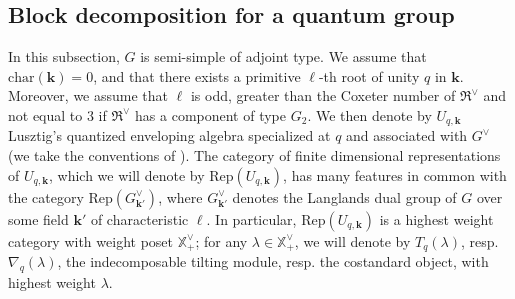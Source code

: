 \documentclass[11pt]{amsart}
\theoremstyle{plain}
\theoremstyle{remark}
\numberwithin{equation}{section}
\begin{document}
	
	\subsection{Block decomposition for a quantum group}\label{Block decomposition of a quantum group}
	In this subsection, $G$ is semi-simple of adjoint type. We assume that $\mathrm{char}(\mathbf{k})=0$, and that there exists a primitive $\ell$-th root of unity $q$ in $\mathbf{k}$. Moreover, we assume that $\ell$ is odd, greater than the Coxeter number of $\mathfrak{R}^\vee$ and not equal to $3$ if $\mathfrak{R}^\vee$ has a component of type $G_2$. We then denote by $U_{q,\mathbf{k}}$ Lusztig's quantized enveloping algebra specialized at $q$ and associated with $G^\vee$ (we take the conventions of \cite[§H]{jantzen2003representations}). The category of finite dimensional representations of $U_{q,\mathbf{k}}$, which we will denote by $\mathrm{Rep}(U_{q,\mathbf{k}})$, has many features in common with the category $\mathrm{Rep}(G^\vee_{\mathbf{k}'})$, where $G^\vee_{\mathbf{k}'}$ denotes the Langlands dual group of $G$ over some field $\mathbf{k}'$ of characteristic $\ell$. In particular, $\mathrm{Rep}(U_{q,\mathbf{k}})$ is a highest weight category with weight poset $\mathbb{X}^\vee_+$; for any $\lambda\in\mathbb{X}^\vee_+$, we will denote by $T_q(\lambda)$, resp. $\nabla_q(\lambda)$, the indecomposable tilting module, resp. the costandard object, with highest weight $\lambda$. 
	
\end{document}
